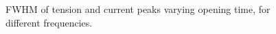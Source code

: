 \begin{figure}
 \centering
 \caption{FWHM of tension and current peaks varying opening time, for different frequencies.}
 \label{fig:times}
\end{figure}

